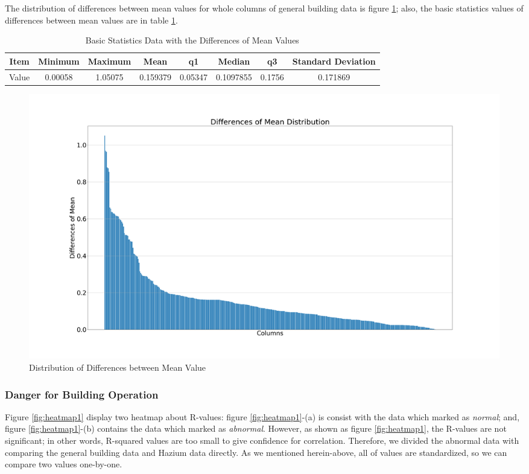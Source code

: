 \documentclass[aps, 10pt, a4paper]{article}
\begin{document}
                The distribution of differences between mean values for whole columns of general building data is figure \ref{fig:dmean}; also, the basic statistics values of differences between mean values are in table \ref{tb:dmean}.
                
                \begin{table}[htbp]
                    \centering
                    \caption{Basic Statistics Data with the Differences of Mean Values}
                    \label{tb:dmean}
                    \begin{tabular}{c||c|c|c|c|c|c|c}
                        Item & Minimum & Maximum & Mean & q1 & Median & q3 & Standard Deviation \\ \hline
                        Value & 0.00058 & 1.05075 & 0.159379 & 0.05347 & 0.1097855 & 0.1756 & 0.171869 \\
                    \end{tabular}
                \end{table}
            
                \begin{figure}[htbp]
                    \centering
                    \includegraphics[width=0.4 \linewidth]{figures/meanvalue.png}
                    \caption{Distribution of Differences between Mean Value}
                    \label{fig:dmean}
                \end{figure}
            
            \subsubsection{Danger for Building Operation}
                Figure \ref{fig:heatmap1} display two heatmap about R-values: figure \ref{fig:heatmap1}-(a) is consist with the data which marked as \textit{normal}; and, figure \ref{fig:heatmap1}-(b) contains the data which marked as \textit{abnormal}. However, as shown as figure \ref{fig:heatmap1}, the R-values are not significant; in other words, R-squared values are too small to give confidence for correlation. Therefore, we divided the abnormal data with comparing the general building data and Hazium data directly. As we mentioned herein-above, all of values are standardized, so we can compare two values one-by-one.
                
\end{document}
